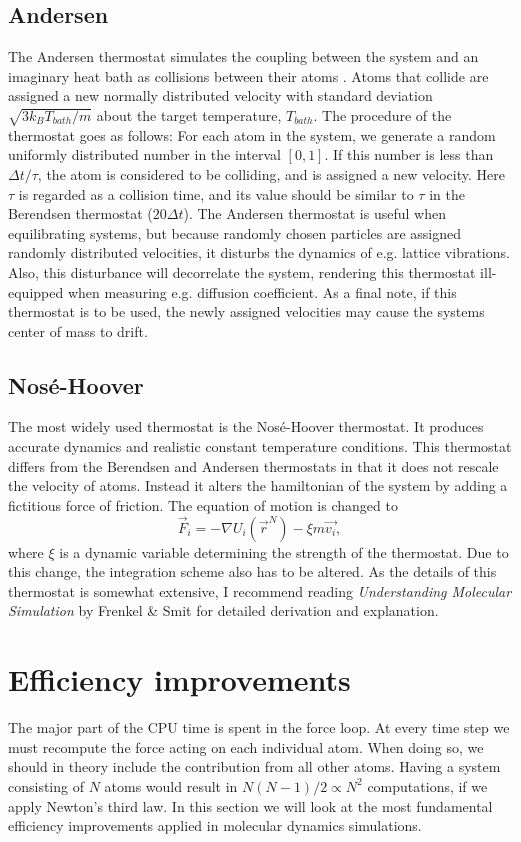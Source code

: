 \documentclass[twoside,english]{uiofysmaster}
\begin{document}
\subsection{Andersen}
The Andersen thermostat simulates the coupling between the system and an imaginary heat bath as collisions between their atoms \cite{thermostat}. 
Atoms that collide are assigned a new normally distributed velocity with standard deviation  $\sqrt{3k_BT_{bath}/m}$ about the target temperature, $T_{bath}$.
The procedure of the thermostat goes as follows:
For each atom in the system, we generate a random uniformly distributed number in the interval $[0,1]$. 
If this number is less than $\Delta t/\tau$, the atom is considered to be colliding, and is assigned a new velocity. 
Here $\tau$ is regarded as a collision time, and its value should be similar to $\tau$ in the Berendsen thermostat ($20\Delta t$). 
The Andersen thermostat is useful when equilibrating systems, but because randomly chosen particles are assigned randomly distributed velocities, it disturbs the dynamics of e.g. lattice vibrations. 
Also, this disturbance will decorrelate the system, rendering this thermostat ill-equipped when measuring e.g. diffusion coefficient.  
As a final note, if this thermostat is to be used, the newly assigned velocities may cause the systems center of mass to drift.


\subsection{Nosé-Hoover}
The most widely used thermostat is the Nosé-Hoover thermostat. 
It produces  accurate dynamics and realistic constant temperature conditions. 
This thermostat differs from the Berendsen and Andersen thermostats in that it does not rescale the velocity of atoms. 
Instead it alters the hamiltonian of the system by adding a fictitious force of friction.
The equation of motion is changed to
\begin{equation}
	\vec{F}_i = -\nabla U_i(\vec{r}^N) -\xi m\vec{v_i} ,
\end{equation}    
where $\xi$ is a dynamic variable determining the strength of the thermostat. 
Due to this change, the integration scheme also has to be altered. 
As the details of this thermostat is somewhat extensive, I recommend reading \textit{Understanding Molecular Simulation} by Frenkel \& Smit \cite{understandingMolecularSimulationFrenkelSmit} for detailed derivation and explanation.

\section{Efficiency improvements}
The major part of the CPU time is spent in the force loop. 
At every time step we must recompute the force acting on each individual atom. 
When doing so, we should in theory include the contribution from all other atoms. 
Having a system consisting of $N$ atoms would result in $N(N-1)/2 \propto N^2$ computations, if we apply Newton's third law.
In this section we will look at the most fundamental efficiency improvements applied in molecular dynamics simulations.
\end{document}
